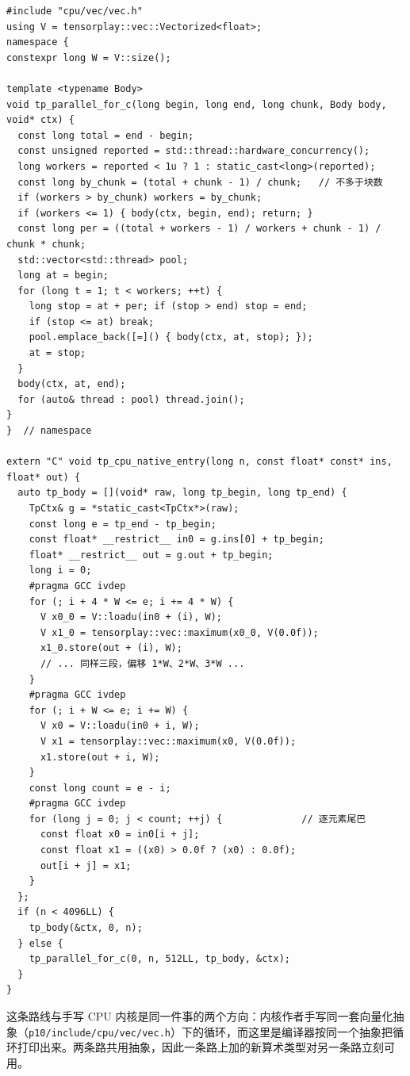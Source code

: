 \begin{lstlisting}[caption={实测生成的 CPU 内核（节选自 \texttt{.tp\_cache/kernels/stax-cpu-native/.../*.cpp}，108 行）。}, label=lst:be:kernel, style=cppstyle]
#include "cpu/vec/vec.h"
using V = tensorplay::vec::Vectorized<float>;
namespace {
constexpr long W = V::size();

template <typename Body>
void tp_parallel_for_c(long begin, long end, long chunk, Body body, void* ctx) {
  const long total = end - begin;
  const unsigned reported = std::thread::hardware_concurrency();
  long workers = reported < 1u ? 1 : static_cast<long>(reported);
  const long by_chunk = (total + chunk - 1) / chunk;   // 不多于块数
  if (workers > by_chunk) workers = by_chunk;
  if (workers <= 1) { body(ctx, begin, end); return; }
  const long per = ((total + workers - 1) / workers + chunk - 1) / chunk * chunk;
  std::vector<std::thread> pool;
  long at = begin;
  for (long t = 1; t < workers; ++t) {
    long stop = at + per; if (stop > end) stop = end;
    if (stop <= at) break;
    pool.emplace_back([=]() { body(ctx, at, stop); });
    at = stop;
  }
  body(ctx, at, end);
  for (auto& thread : pool) thread.join();
}
}  // namespace

extern "C" void tp_cpu_native_entry(long n, const float* const* ins, float* out) {
  auto tp_body = [](void* raw, long tp_begin, long tp_end) {
    TpCtx& g = *static_cast<TpCtx*>(raw);
    const long e = tp_end - tp_begin;
    const float* __restrict__ in0 = g.ins[0] + tp_begin;
    float* __restrict__ out = g.out + tp_begin;
    long i = 0;
    #pragma GCC ivdep
    for (; i + 4 * W <= e; i += 4 * W) {
      V x0_0 = V::loadu(in0 + (i), W);
      V x1_0 = tensorplay::vec::maximum(x0_0, V(0.0f));
      x1_0.store(out + (i), W);
      // ... 同样三段，偏移 1*W、2*W、3*W ...
    }
    #pragma GCC ivdep
    for (; i + W <= e; i += W) {
      V x0 = V::loadu(in0 + i, W);
      V x1 = tensorplay::vec::maximum(x0, V(0.0f));
      x1.store(out + i, W);
    }
    const long count = e - i;
    #pragma GCC ivdep
    for (long j = 0; j < count; ++j) {              // 逐元素尾巴
      const float x0 = in0[i + j];
      const float x1 = ((x0) > 0.0f ? (x0) : 0.0f);
      out[i + j] = x1;
    }
  };
  if (n < 4096LL) {
    tp_body(&ctx, 0, n);
  } else {
    tp_parallel_for_c(0, n, 512LL, tp_body, &ctx);
  }
}
\end{lstlisting}

这条路线与手写 CPU 内核是同一件事的两个方向：内核作者手写同一套向量化抽象（\texttt{p10/include/cpu/vec/vec.h}）下的循环，而这里是编译器按同一个抽象把循环打印出来。两条路共用抽象，因此一条路上加的新算术类型对另一条路立刻可用。

